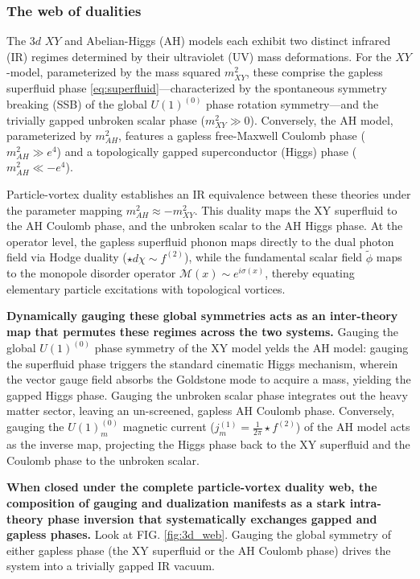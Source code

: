 \documentclass[aps,preprint,nofootinbib,preprintnumbers,eqsecnum,superscriptaddress]{revtex4}
\numberwithin{equation}{section}
\begin{document}
\subsubsection{The web of dualities}
The $3d$ $XY$ and Abelian-Higgs (AH) models each exhibit two distinct infrared (IR) regimes determined by their ultraviolet (UV) mass deformations. For the $XY$-model, parameterized by the mass squared $m_{XY}^2$, these comprise the gapless superfluid phase \ref{eq:superfluid}—characterized by the spontaneous symmetry breaking (SSB) of the global $U(1)^{(0)}$ phase rotation symmetry—and the trivially gapped unbroken scalar phase ($m_{XY}^2 \gg 0 $). Conversely, the AH model, parameterized by $m_{AH}^2$, features a gapless free-Maxwell Coulomb phase ($m_{AH}^2 \gg e^4$) and a topologically gapped superconductor (Higgs) phase ($m_{AH}^2 \ll -e^4$).

Particle-vortex duality establishes an IR equivalence between these theories under the parameter mapping $m_{AH}^2 \approx -m_{XY}^2$. This duality maps the XY superfluid to the AH Coulomb phase, and the unbroken scalar to the AH Higgs phase. At the operator level, the gapless superfluid phonon maps directly to the dual photon field via Hodge duality ($\star d\chi \sim f^{(2)}$), while the fundamental scalar field $\tilde{\phi}$ maps to the monopole disorder operator $\mathcal{M}(x) \sim e^{i\sigma (x)}$, thereby equating elementary particle excitations with topological vortices.

{\bf Dynamically gauging these global symmetries acts as an inter-theory map that permutes these regimes across the two systems.} Gauging the global $U(1)^{(0)}$ phase symmetry of the XY model yelds the AH model: gauging the superfluid phase triggers the standard cinematic Higgs mechanism, wherein the vector gauge field absorbs the Goldstone mode to acquire a mass, yielding the gapped Higgs phase. Gauging the unbroken scalar phase integrates out the heavy matter sector, leaving an un-screened, gapless AH Coulomb phase. Conversely, gauging the $U(1)^{(0)}_{m}$ magnetic current ($j^{(1)}_{m} = \frac{1}{2\pi}\star f^{(2)}$) of the AH model acts as the inverse map, projecting the Higgs phase back to the XY superfluid and the Coulomb phase to the unbroken scalar.

{\bf When closed under the complete particle-vortex duality web, the composition of gauging and dualization manifests as a stark intra-theory phase inversion that systematically exchanges gapped and gapless phases.} Look at FIG. \ref{fig:3d_web}. Gauging the global symmetry of either gapless phase (the XY superfluid or the AH Coulomb phase) drives the system into a trivially gapped IR vacuum. 
\end{document}
